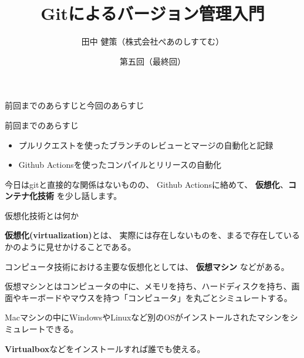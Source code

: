 \documentclass[12pt, unicode]{beamer}
\title{Gitによるバージョン管理入門}
\author{田中 健策（株式会社ぺあのしすてむ）}
\date[2019/10/30]{第五回（最終回）}
\begin{document}
\frame{\maketitle}

\begin{frame}{前回までのあらすじと今回のあらすじ}

前回までのあらすじ
\begin{itemize}
\item プルリクエストを使ったブランチのレビューとマージの自動化と記録
\item Github Actionsを使ったコンパイルとリリースの自動化
\end{itemize}

今日はgitと直接的な関係はないものの、
Github Actionsに絡めて、
\textbf{仮想化}、\textbf{コンテナ化技術}
を少し話します。

\end{frame}

\begin{frame}{仮想化技術とは何か}

\textbf{仮想化(virtualization)}とは、
実際には存在しないものを、まるで存在しているかのように見せかけることである。

コンピュータ技術における主要な仮想化としては、
\textbf{仮想マシン}
などがある。

\vspace{1.0\baselineskip}

仮想マシンとはコンピュータの中に、メモリを持ち、ハードディスクを持ち、画面やキーボードやマウスを持つ「コンピュータ」を丸ごとシミュレートする。

Macマシンの中にWindowsやLinuxなど別のOSがインストールされたマシンをシミュレートできる。

\textbf{Virtualbox}などをインストールすれば誰でも使える。

\end{frame}
\end{document}
